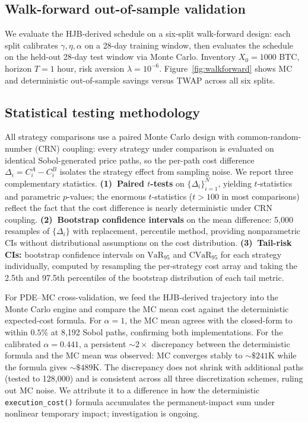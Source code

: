 \documentclass[11pt,letterpaper]{article}
\begin{document}
\subsection{Walk-forward out-of-sample validation}

We evaluate the HJB-derived schedule on a six-split walk-forward design: each split calibrates \(\gamma,\eta,\alpha\) on a 28-day training window, then evaluates the schedule on the held-out 28-day test window via Monte Carlo. Inventory \(X_0=1000\) BTC, horizon \(T=1\) hour, risk aversion \(\lambda=10^{-6}\). Figure~\ref{fig:walkforward} shows MC and deterministic out-of-sample savings versus TWAP across all six splits.

\subsection{Statistical testing methodology}
\label{sec:stat-testing}
 
All strategy comparisons use a paired Monte Carlo design with
common-random-number (CRN) coupling: every strategy under comparison is
evaluated on identical Sobol-generated price paths, so the per-path cost
difference $\Delta_{i} = C_{i}^{A} - C_{i}^{B}$ isolates the strategy
effect from sampling noise.  We report three complementary statistics.
\textbf{(1)~Paired $t$-tests} on $\{\Delta_{i}\}_{i=1}^{N}$, yielding
$t$-statistics and parametric $p$-values; the enormous $t$-statistics
($t>100$ in most comparisons) reflect the fact that the cost difference is
nearly deterministic under CRN coupling.
\textbf{(2)~Bootstrap confidence intervals} on the mean difference:
5{,}000 resamples of $\{\Delta_{i}\}$ with replacement, percentile method,
providing nonparametric CIs without distributional assumptions on the
cost distribution.
\textbf{(3)~Tail-risk CIs:} bootstrap confidence intervals on
$\mathrm{VaR}_{95}$ and $\mathrm{CVaR}_{95}$ for each strategy individually,
computed by resampling the per-strategy cost array and taking the 2.5th
and 97.5th percentiles of the bootstrap distribution of each tail metric.
 
For PDE--MC cross-validation, we feed the HJB-derived trajectory into
the Monte Carlo engine and compare the MC mean cost against the
deterministic expected-cost formula.  For $\alpha=1$, the MC mean agrees
with the closed-form to within $0.5\%$ at 8{,}192 Sobol paths, confirming
both implementations.  For the calibrated $\alpha=0.441$, a persistent
$\sim\!2\times$ discrepancy between the deterministic formula and the MC
mean was observed: MC converges stably to ${\sim}\$241\mathrm{K}$ while
the formula gives ${\sim}\$489\mathrm{K}$.  The discrepancy does not
shrink with additional paths (tested to 128{,}000) and is consistent
across all three discretization schemes, ruling out MC noise.  We
attribute it to a difference in how the deterministic
\texttt{execution\_cost()} formula accumulates the permanent-impact sum
under nonlinear temporary impact; investigation is ongoing.
\end{document}
